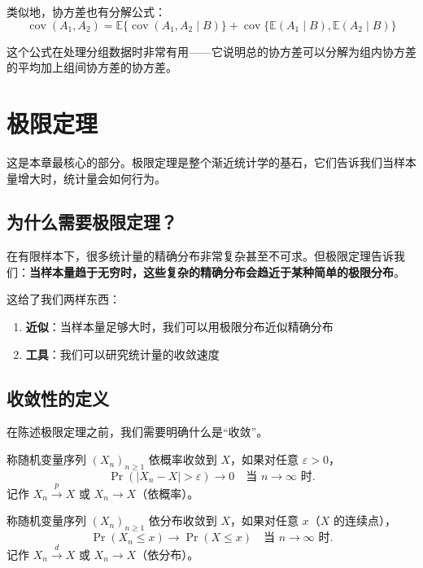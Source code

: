 类似地，协方差也有分解公式：
\[
\operatorname{cov}(A_1, A_2) = \mathbb{E}\{\operatorname{cov}(A_1, A_2 \mid B)\} + \operatorname{cov}\{\mathbb{E}(A_1 \mid B), \mathbb{E}(A_2 \mid B)\}
\]

这个公式在处理分组数据时非常有用——它说明总的协方差可以分解为组内协方差的平均加上组间协方差的协方差。

\section{极限定理}\label{sec:limiting-theorems}

这是本章最核心的部分。极限定理是整个渐近统计学的基石，它们告诉我们当样本量增大时，统计量会如何行为。

\subsection{为什么需要极限定理？}

在有限样本下，很多统计量的精确分布非常复杂甚至不可求。但极限定理告诉我们：\textbf{当样本量趋于无穷时，这些复杂的精确分布会趋近于某种简单的极限分布}。

这给了我们两样东西：
\begin{enumerate}
  \item \textbf{近似}：当样本量足够大时，我们可以用极限分布近似精确分布
  \item \textbf{工具}：我们可以研究统计量的收敛速度
\end{enumerate}

\subsection{收敛性的定义}

在陈述极限定理之前，我们需要明确什么是``收敛''。

\begin{Definition}[依概率收敛]\label{def:convergence-probability}
称随机变量序列 $(X_n)_{n \geq 1}$ 依概率收敛到 $X$，如果对任意 $\varepsilon > 0$，
\[
\Pr(|X_n - X| > \varepsilon) \to 0 \quad \text{当 } n \to \infty \text{ 时}.
\]
记作 $X_n \xrightarrow{p} X$ 或 $X_n \to X$（依概率）。
\end{Definition}

\begin{Definition}[依分布收敛]\label{def:convergence-distribution}
称随机变量序列 $(X_n)_{n \geq 1}$ 依分布收敛到 $X$，如果对任意 $x$（$X$ 的连续点），
\[
\Pr(X_n \leq x) \to \Pr(X \leq x) \quad \text{当 } n \to \infty \text{ 时}.
\]
记作 $X_n \xrightarrow{d} X$ 或 $X_n \to X$（依分布）。
\end{Definition}

